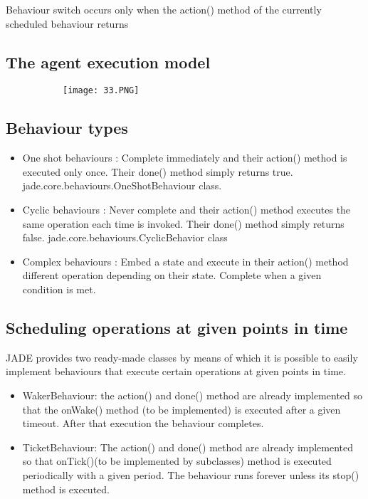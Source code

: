 \documentclass{article}
\begin{document}
Behaviour switch occurs only when the action() method of the currently scheduled behaviour returns

\subsection{The agent execution model}

\begin{figure}[ht!]
  \centering
  \begin{subfigure}[b]{0.8\linewidth}
    \texttt{[image: 33.PNG]}
  \end{subfigure}
  \end{figure}

\subsection{Behaviour types}

\begin{itemize}
    \item One shot behaviours : Complete immediately and their action() method is executed only once. Their done() method simply returns true. jade.core.behaviours.OneShotBehaviour class.
    \item Cyclic behaviours : Never complete and their action() method executes the same operation each time is invoked. Their done() method simply returns false. jade.core.behaviours.CyclicBehavior class
    \item Complex behaviours : Embed a state and execute in their action() method different operation depending on their state. Complete when a given condition is met.
\end{itemize}

\subsection{Scheduling operations at given points in time}

JADE provides two ready-made classes by means of which it is possible to easily implement behaviours that execute certain operations at given points in time.

\begin{itemize}
    \item WakerBehaviour: the action() and done() method are already implemented so that the onWake() method (to be implemented) is executed after a given timeout. After that execution the behaviour completes.
    \item TicketBehaviour: The action() and done() method are already implemented so that onTick()(to be implemented by subclasses) method is executed periodically with a given period. The behaviour runs forever unless its stop() method is executed.
\end{itemize}
\end{document}
